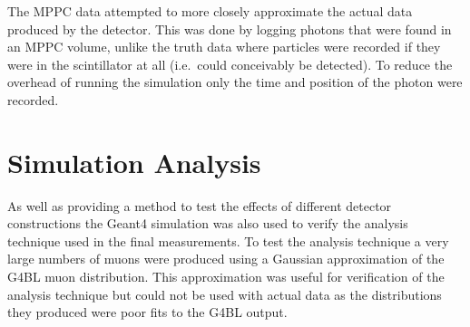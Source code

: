 The MPPC data attempted to more closely approximate the actual data produced by the detector. This was done by logging photons that were found in an MPPC volume, unlike the truth data where particles were recorded if they were in the scintillator at all (i.e.\  could conceivably be detected). To reduce the overhead of running the simulation only the time and position of the photon were recorded.


\section{Simulation Analysis} %
\label{cha:simulation_analysis}

As well as providing a method to test the effects of different detector constructions the Geant4 simulation was also used to verify the analysis technique used in the final measurements. To test the analysis technique a very large numbers of muons were produced using a Gaussian approximation of the G4BL muon distribution. This approximation was useful for verification of the analysis technique but could not be used with actual data as the distributions they produced were poor fits to the G4BL output.




